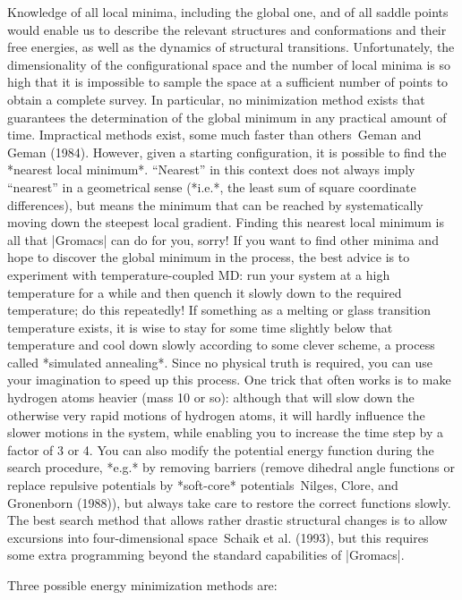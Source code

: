 Knowledge of all local minima, including the global one, and of all
saddle points would enable us to describe the relevant structures and
conformations and their free energies, as well as the dynamics of
structural transitions. Unfortunately, the dimensionality of the
configurational space and the number of local minima is so high that it
is impossible to sample the space at a sufficient number of points to
obtain a complete survey. In particular, no minimization method exists
that guarantees the determination of the global minimum in any practical
amount of time. Impractical methods exist, some much faster than
others Geman and Geman (1984). However, given a starting configuration,
it is possible to find the *nearest local minimum*. “Nearest” in this
context does not always imply “nearest” in a geometrical sense (*i.e.*,
the least sum of square coordinate differences), but means the minimum
that can be reached by systematically moving down the steepest local
gradient. Finding this nearest local minimum is all that |Gromacs| can do
for you, sorry! If you want to find other minima and hope to discover
the global minimum in the process, the best advice is to experiment with
temperature-coupled MD: run your system at a high temperature for a
while and then quench it slowly down to the required temperature; do
this repeatedly! If something as a melting or glass transition
temperature exists, it is wise to stay for some time slightly below that
temperature and cool down slowly according to some clever scheme, a
process called *simulated annealing*. Since no physical truth is
required, you can use your imagination to speed up this process. One
trick that often works is to make hydrogen atoms heavier (mass 10 or
so): although that will slow down the otherwise very rapid motions of
hydrogen atoms, it will hardly influence the slower motions in the
system, while enabling you to increase the time step by a factor of 3 or
4. You can also modify the potential energy function during the search
procedure, *e.g.* by removing barriers (remove dihedral angle functions
or replace repulsive potentials by *soft-core* potentials Nilges, Clore,
and Gronenborn (1988)), but always take care to restore the correct
functions slowly. The best search method that allows rather drastic
structural changes is to allow excursions into four-dimensional
space Schaik et al. (1993), but this requires some extra programming
beyond the standard capabilities of |Gromacs|.

Three possible energy minimization methods are:

